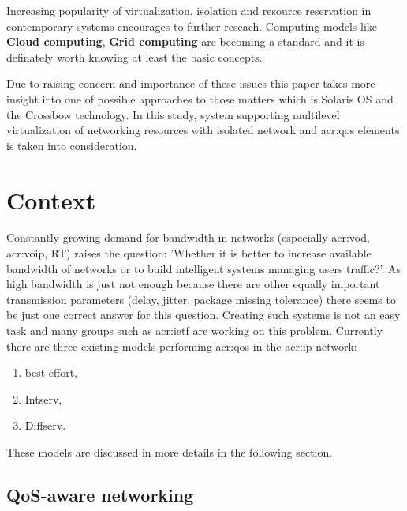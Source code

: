 \documentclass[11pt]{book}
\begin{document}
	
	Increasing popularity of virtualization, isolation and resource reservation in contemporary systems encourages to 
	further reseach. Computing models like \textbf{Cloud computing}, \textbf{Grid computing} are becoming a standard and it 
	is definately worth knowing at least the basic concepts.
	
	\medskip
	
	Due to raising concern and importance of these issues this paper takes more insight into one of 
	possible approaches	to those matters which is Solaris OS and the Crossbow technology. In this study, system supporting 
	multilevel virtualization of networking resources with isolated network and \gls{acr:qos} elements is taken into consideration.


  \chapter{Context}  %

    Constantly growing demand for bandwidth in networks (especially \gls{acr:vod}, \gls{acr:voip}, RT) raises the
    question: 'Whether it is better to increase available bandwidth of networks or to build intelligent systems managing
    users traffic?'. As high bandwidth is just not enough because there are other equally important transmission
    parameters (delay, jitter, package missing	tolerance) there seems to be just one correct answer for this question.
    Creating such systems is not an easy task and many groups such as \gls{acr:ietf} are working on this problem.
    Currently there are three existing models performing \gls{acr:qos} in the \gls{acr:ip} network:

    \begin{enumerate}
      \item best effort,
      \item Intserv,
      \item Diffserv.
    \end{enumerate}

    These models are discussed in more details in the following section.


    \section{QoS-aware networking}
\end{document}
